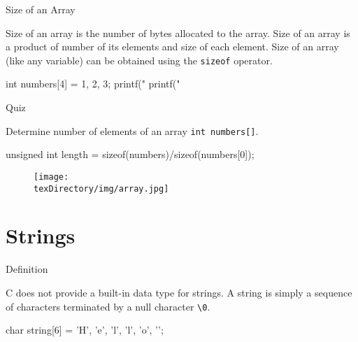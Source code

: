 \documentclass[compress]{beamer}
\begin{document}
\begin{slide}
	\begin{block}{Size of an Array}

	Size of an array is the number of bytes allocated to the array.
	Size of an array is a product of number of its elements and size of each element.
	Size of an array (like any variable) can be obtained using the \alert{\texttt{sizeof}} operator.

	\begin{terminal}
	int numbers[4] = {1, 2, 3};
	printf("%
	printf("%
	\end{terminal}

	\end{block}
\end{slide}

\begin{slide}
	\begin{block}{Quiz}

	Determine number of elements of an array \texttt{int numbers[]}.

	\pause

	\begin{terminal}
	unsigned int length = sizeof(numbers)/sizeof(numbers[0]);
	\end{terminal}

	\end{block}
\end{slide}

\begin{slide}
	\begin{figure}
	\texttt{[image: \\texDirectory/img/array.jpg]}
	\end{figure}
\end{slide}

\section{Strings}

\begin{slide}
	\begin{block}{Definition}

	C does not provide a built-in data type for strings.
	A string is simply a sequence of characters terminated by a null character \alert{\texttt{\textbackslash 0}}.

	\begin{terminal}
	char string[6] = {'H', 'e', 'l', 'l', 'o', '\0'};
	\end{terminal}

	\end{block}
\end{slide}
\end{document}
